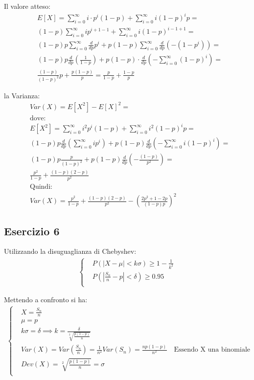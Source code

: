 \documentclass[12pt]{article}
\begin{document}
Il valore atteso:
\begin{align*}
    &E[X] = \sum_{i=0}^{\infty}i\cdot p^i(1-p)+\sum_{i=0}^{\infty}i(1-p)^ip = \\
    &(1-p)\sum_{i=0}^{\infty}ip^{i+1-1}+\sum_{i=0}^{\infty}i(1-p)^{i-1+1} = \\
    &(1-p)p\sum_{i=0}^{\infty}\frac{d}{dp}p^i + p(1-p)\sum_{i=0}^{\infty}\frac{d}{dp}(-(1-p^i)) = \\
    &(1-p)p\frac{d}{dp}\left(\frac{1}{1-p}\right) + p(1-p)\cdot\frac{d}{dp}\left(-\sum_{i=0}^{\infty}(1-p)^i\right) = \\
    &\frac{(1-p)}{(1-p)^2}p+\frac{p(1-p)}{p} = \frac{p}{1-p} + \frac{1-p}{p}
\end{align*}

la Varianza:
\begin{align*}
    &Var(X) = E[X^2]-E[X]^2 = \\
    &\text{dove:} \\
    &E[X^2] = \sum_{i=0}^{\infty}i^2p^i(1-p)+ \sum_{i=0}^{\infty}i^2(1-p)^ip = \\
    &(1-p)p\frac{d}{dp}\left(\sum_{i=0}^{\infty}ip^i\right) + p(1-p)\frac{d}{dp}\left(-\sum_{i=0}^{\infty}i(1-p)^i\right) = \\
    &(1-p)p\frac{p}{(1-p)^2}+p(1-p)\frac{d}{dp}\left(-\frac{(1-p)}{p^2}\right) = \\
    &\frac{p^2}{1-p}+\frac{(1-p)(2-p)}{p^2} \\
    &\text{Quindi:} \\
    &Var(X) = \frac{p^2}{1-p}+\frac{(1-p)(2-p)}{p^2} - \left(\frac{2p^2+1-2p}{(1-p)p}\right)^2
\end{align*}

\newpage
\subsection*{Esercizio 6}
Utilizzando la disuguaglianza di Chebyshev:
\begin{align*}
    \begin{cases}
        &P(|X-\mu| < k\sigma) \ge 1-\frac{1}{k^2} \\
        &P(|\frac{S_n}{n}-p|< \delta) \ge 0.95 \\
    \end{cases}
\end{align*}

Mettendo a confronto si ha:
\begin{align*}
    \begin{cases}
        &X = \frac{S_n}{n} \\
        &\mu = p \\
        &k\sigma = \delta \implies k = \frac{\delta}{\sqrt[2]{\frac{p(1-p)}{n}}} \\
        &Var(X) = Var(\frac{S_n}{n}) = \frac{1}{n^2}Var(S_n) = \frac{np(1-p)}{n^2} \quad \text{Essendo X una binomiale} \\
        &Dev(X) = \sqrt[2]{\frac{p(1-p)}{n}} = \sigma \\
    \end{cases}
\end{align*}
\end{document}
